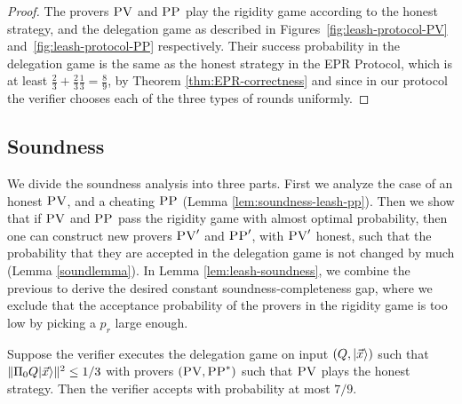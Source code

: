 \begin{proof}
The provers $\textsc{PV}$ and $\textsc{PP}$ play the rigidity game according to the honest strategy, and the delegation game as described in Figures~\ref{fig:leash-protocol-PV} and~\ref{fig:leash-protocol-PP} respectively. Their success probability in the delegation game is the same as the honest strategy in the EPR Protocol, which is at least $\frac{2}{3}+\frac{2}{3}\frac{1}{3}=\frac{8}{9}$, by Theorem \ref{thm:EPR-correctness} and since in our protocol the verifier chooses each of the three types of rounds uniformly.
\end{proof}

\subsection{Soundness}



We divide the soundness analysis into three parts. First we analyze the case of an honest $\textsc{PV}$, and a cheating $\textsc{PP}$ (Lemma \ref{lem:soundness-leash-pp}). Then we show that if $\textsc{PV}$ and $\textsc{PP}$ pass the rigidity game with almost optimal probability, then one can construct new provers $\textsc{PV}'$ and $\textsc{PP}'$, with $\textsc{PV}'$ honest, such that the probability that they are accepted in the delegation game is not changed by much (Lemma \ref{soundlemma}). In Lemma \ref{lem:leash-soundness}, we combine the previous to derive the desired constant soundness-completeness gap, where we exclude that the acceptance probability of the provers in the rigidity game is too low by picking a $p_r$ large enough.


\begin{lemma}\label{lem:soundness-leash-pp}
Suppose the verifier executes the delegation  game on input $(Q,|\vec{x}\rangle)$ such that $\|\Pi_0 Q|\vec{x}\rangle\|^2 \leq 1/3$ with provers $(\textsc{PV},\textsc{PP}^*)$ such that $\textsc{PV}$ plays the honest strategy. Then the verifier accepts with probability at most $7/9$. 
\end{lemma}

